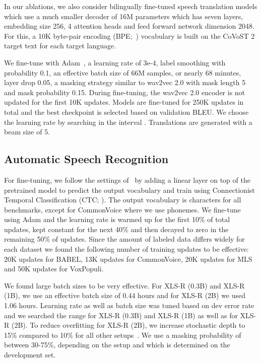 \documentclass{article} \usepackage{iclr2022_conference,times}
\newcommand{\xlsrp}{XLS-R}
\newcommand{\xlsrpb}[1]{\xlsrp{} {(#1B)}}
\begin{document}
In our ablations, we also consider bilingually fine-tuned speech translation models which use a much smaller decoder of 16M parameters which has seven layers, embedding size 256, 4 attention heads and feed forward network dimension 2048.
For this, a 10K byte-pair encoding (BPE;~\citealt{sennrich2016bpe}) vocabulary is built on the CoVoST 2 target text for each target language. 

We fine-tune with Adam~\citep{kingma2015adam}, a learning rate of 3e-4, label smoothing with probability 0.1, an effective batch size of 66M samples, or nearly 68 minutes, layer drop 0.05, a masking strategy similar to wav2vec 2.0 with mask length 5 and mask probability 0.15.
During fine-tuning, the wav2vec 2.0 encoder is not updated for the first 10K updates. 
Models are fine-tuned for 250K updates in total and the best checkpoint is selected based on validation BLEU. 
We choose the learning rate by searching in the interval .
Translations are generated with a beam size of 5.


\subsection{Automatic Speech Recognition}

For fine-tuning, we follow the settings of~\citet{baevski2020wav} by adding a linear layer on top of the pretrained model to predict the output vocabulary and train using Connectionist Temporal Classification (CTC; \citealt{graves2006ctc}).
The output vocabulary is characters for all benchmarks, except for CommonVoice where we use phonemes.
We fine-tune using Adam and the learning rate is warmed up for the first 10\% of total updates, kept constant for the next 40\% and then decayed to zero in the remaining 50\% of updates. 
Since the amount of labeled data differs widely for each dataset we found the following number of training updates to be effective: 20K updates for BABEL, 13K updates for CommonVoice, 20K updates for MLS and 50K updates for VoxPopuli. 

We found large batch sizes to be very effective.
For \xlsrpb{0.3} and \xlsrpb{1}, we use an effective batch size of 0.44 hours and for \xlsrpb{2} we used 1.06 hours. 
Learning rate as well as batch size was tuned based on dev error rate and we searched the range  for \xlsrpb{0.3} and \xlsrpb{1} as well as  for \xlsrpb{2}.
To reduce overfitting for \xlsrpb{2}, we increase stochastic depth to 15\% compared to 10\% for all other setups~\citep{huang2016stochasticdepth,fan2019layerdrop}. 
We use a masking probability of between 30-75\%, depending on the setup and which is determined on the development set.
\end{document}
